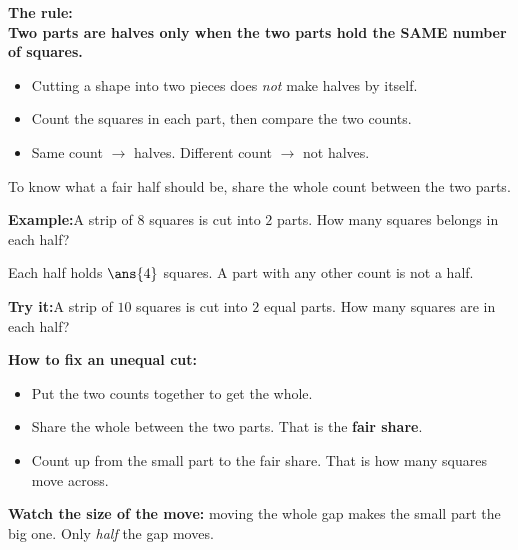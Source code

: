 \documentclass[12pt]{article}
\begin{document}


\begin{formulabox}
\textbf{The rule:}\\[4pt]
\textbf{Two parts are halves only when the two parts hold the SAME number of
squares.}
\begin{itemize}[leftmargin=0.8cm, itemsep=1pt, topsep=2pt]
  \item Cutting a shape into two pieces does \emph{not} make halves by itself.
  \item Count the squares in each part, then compare the two counts.
  \item Same count $\rightarrow$ halves. Different count $\rightarrow$ not halves.
\end{itemize}
To know what a fair half should be, share the whole count between the two parts.
\end{formulabox}

\begin{examplebox}
\textbf{Example:}\quad A strip of $8$ squares is cut into $2$ parts. How many
squares belongs in each half?



Each half holds $\ans{4}$ squares. A part with any other count is not a half.
\end{examplebox}

\begin{tryitbox}
\textbf{Try it:}\quad A strip of $10$ squares is cut into $2$ equal parts. How
many squares are in each half?

\end{tryitbox}


\begin{formulabox}
\textbf{How to fix an unequal cut:}
\begin{itemize}[leftmargin=0.8cm, itemsep=1pt, topsep=2pt]
  \item Put the two counts together to get the whole.
  \item Share the whole between the two parts. That is the \textbf{fair share}.
  \item Count up from the small part to the fair share. That is how many squares
        move across.
\end{itemize}
\textbf{Watch the size of the move:} moving the whole gap makes the small part
the big one. Only \emph{half} the gap moves.
\end{formulabox}
\end{document}
